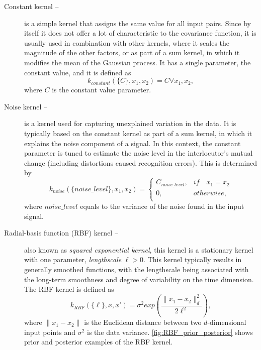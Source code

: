 \begin{description}
	\item[Constant kernel -- ]
	is a simple kernel that assigns the same value for all input pairs.
	Since by itself it does not offer a lot of characteristic to the covariance function, it is usually used in combination with other kernels, where it scales the magnitude of the other factors, or as part of a sum kernel, in which it modifies the mean of the Gaussian process.
	It has a single parameter, the constant value, and it is defined as 
	\begin{equation}
		\label{eq:constant_kernel}
		k_{constant}(\{C\}, x_1, x_2) = C\forall x_1, x_2,
	\end{equation}
	where $C$ is the constant value parameter.
	
	\item[Noise kernel -- ]
	is a kernel used for capturing unexplained variation in the data.
	It is typically based on the constant kernel as part of a sum kernel, in which it explains the noise component of a signal.
	In this context, the constant parameter is tuned to estimate the noise level in the interlocutor's mutual change (including distortions caused recognition errors).
	This is determined by
	\begin{equation}
		\label{eq:noise_kernel}
		k_{noise}(\{noise\_level\}, x_1, x_2) =
		\begin{cases}
		C_{noise\_level}, & if\quad x_1 = x_2\\
		0, & otherwise,\\
		\end{cases}
	\end{equation}
	where $noise\_level$ equals to the variance of the noise found in the input signal.
	
	\item[Radial-basis function (RBF) kernel --]
	also known as \emph{squared exponential kernel}, this kernel is a stationary kernel with one parameter, \emph{lengthscale} $\ell > 0$.
	This kernel typically results in generally smoothed functions, with the lengthscale being associated with the long-term smoothness and degree of variability on the time dimension.
	The RBF kernel is defined as
	\begin{equation}
		\label{eq:RBF_kernel}
		k_{RBF}(\{\ell\}, x, x') = \sigma^2 exp\left(\frac{\lVert x_1 - x_2 \lVert ^2_d}{2\ell^2}\right),
	\end{equation}
	where $\lVert x_1 - x_2 \lVert$ is the Euclidean distance between two $d$-dimensional input points and $\sigma^2$ is the data variance.
	\cref{fig:RBF_prior_posterior} shows prior and posterior examples of the RBF kernel.
	

\end{description}

